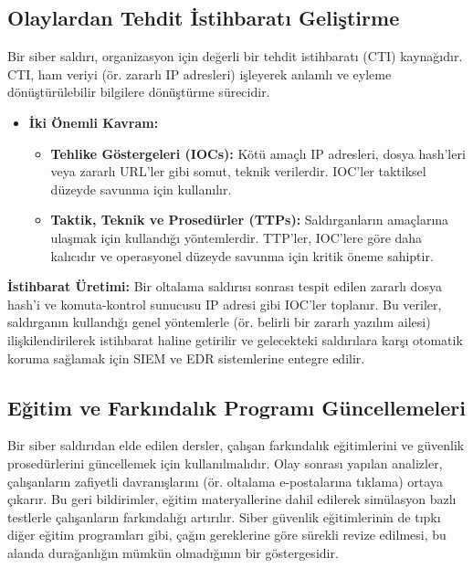 \begin{itemize}
\subsection{Olaylardan Tehdit İstihbaratı Geliştirme}

Bir siber saldırı, organizasyon için değerli bir tehdit istihbaratı (CTI) kaynağıdır. CTI, ham veriyi (ör. zararlı IP adresleri) işleyerek anlamlı ve eyleme dönüştürülebilir bilgilere dönüştürme sürecidir.

\begin{itemize}
    \item \textbf{İki Önemli Kavram:}
    \begin{itemize}
        \item \textbf{Tehlike Göstergeleri (IOCs):} Kötü amaçlı IP adresleri, dosya hash'leri veya zararlı URL'ler gibi somut, teknik verilerdir. IOC'ler taktiksel düzeyde savunma için kullanılır.
        \item \textbf{Taktik, Teknik ve Prosedürler (TTPs):} Saldırganların amaçlarına ulaşmak için kullandığı yöntemlerdir. TTP'ler, IOC'lere göre daha kalıcıdır ve operasyonel düzeyde savunma için kritik öneme sahiptir.
    \end{itemize}
\end{itemize}
\textbf{İstihbarat Üretimi:}
Bir oltalama saldırısı sonrası tespit edilen zararlı dosya hash'i ve komuta-kontrol sunucusu IP adresi gibi IOC'ler toplanır. Bu veriler, saldırganın kullandığı genel yöntemlerle (ör. belirli bir zararlı yazılım ailesi) ilişkilendirilerek istihbarat haline getirilir ve gelecekteki saldırılara karşı otomatik koruma sağlamak için SIEM ve EDR sistemlerine entegre edilir.

\subsection{Eğitim ve Farkındalık Programı Güncellemeleri}

Bir siber saldırıdan elde edilen dersler, çalışan farkındalık eğitimlerini ve güvenlik prosedürlerini güncellemek için kullanılmalıdır. Olay sonrası yapılan analizler, çalışanların zafiyetli davranışlarını (ör. oltalama e-postalarına tıklama) ortaya çıkarır. Bu geri bildirimler, eğitim materyallerine dahil edilerek simülasyon bazlı testlerle çalışanların farkındalığı artırılır. Siber güvenlik eğitimlerinin de tıpkı diğer eğitim programları gibi, çağın gereklerine göre sürekli revize edilmesi, bu alanda durağanlığın mümkün olmadığının bir göstergesidir.


\end{itemize}

